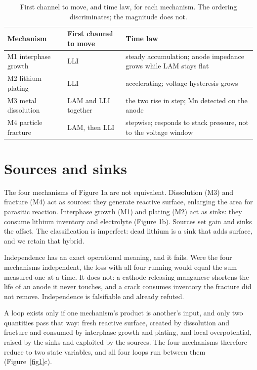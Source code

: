 \documentclass[AMA,Times2COL]{WileyNJDv5}
\begin{document}
\begin{table}[t]
\caption{First channel to move, and time law, for each mechanism. The ordering discriminates; the magnitude does not.}
\label{tab1}
\begin{tabular*}{\textwidth}{@{\extracolsep\fill}lll@{}}
\toprule
Mechanism & First channel to move & Time law\\
\midrule
M1 interphase growth & LLI & steady accumulation; anode impedance grows while LAM stays flat\\
M2 lithium plating & LLI & accelerating; voltage hysteresis grows\\
M3 metal dissolution & LAM and LLI together & the two rise in step; Mn detected on the anode\\
M4 particle fracture & LAM, then LLI & stepwise; responds to stack pressure, not to the voltage window\\
\bottomrule
\end{tabular*}
\end{table}

\section{Sources and sinks}\label{sec:Sourcesandsinks}
The four mechanisms of Figure 1a are not equivalent. Dissolution (M3) and fracture (M4) act as sources: they generate reactive surface, enlarging the area for parasitic reaction.\cite{single2018identifying} Interphase growth (M1) and plating (M2) act as sinks: they consume lithium inventory and electrolyte (Figure 1b).\cite{nojabaee2021understanding,brown2021detecting} Sources set gain and sinks the offset. The classification is imperfect: dead lithium is a sink that adds surface, and we retain that hybrid.

Independence has an exact operational meaning, and it fails. Were the four mechanisms independent, the loss with all four running would equal the sum measured one at a time. It does not: a cathode releasing manganese shortens the life of an anode it never touches, and a crack consumes inventory the fracture did not remove.\cite{santos2023chemistry} Independence is falsifiable and already refuted.

A loop exists only if one mechanism's product is another's input, and only two quantities pass that way: fresh reactive surface, created by dissolution and fracture and consumed by interphase growth and plating, and local overpotential, raised by the sinks and exploited by the sources. The four mechanisms therefore reduce to two state variables, and all four loops run between them (Figure~\ref{fig1}c).
\end{document}

